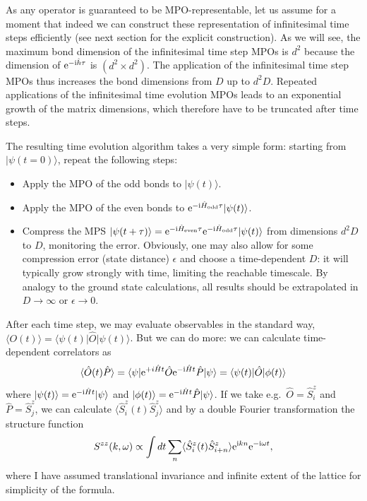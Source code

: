 \documentclass[a4paper,10pt,oneside,onecolumn,1p,times]{elsarticle}
\newcommand{\eul}{{\rm e }}
\newcommand{\imag}{{\rm i }}
\newcommand{\bra}[1]{\mbox{$\langle #1  |$}}
\newcommand{\ket}[1]{\mbox{$| #1  \rangle$}}
\begin{document}
As any operator is guaranteed to be MPO-representable, let us assume for a moment that indeed we can construct these representation of infinitesimal time steps efficiently (see next section for the explicit construction). As we will see, the maximum bond dimension of the infinitesimal time step MPOs is $d^2$ because the dimension of $\eul^{-\imag \hat{h} \tau}$ is $(d^2 \times d^2)$. The application of the infinitesimal time step MPOs thus increases the bond dimensions from $D$ up to $d^2 D$. Repeated applications of the infinitesimal time evolution MPOs leads to an exponential growth of the matrix dimensions, which therefore have to be truncated after time steps.

The resulting time evolution algorithm takes a very simple form: starting from $\ket{\psi(t=0)}$, repeat the following steps:
\begin{itemize}
\item Apply the MPO of the odd bonds to $\ket{\psi(t)}$.
\item Apply the MPO of the even bonds to $\eul^{-\imag \hat{H}_{{\rm odd}}\tau}\ket{\psi(t)}$.
\item Compress the MPS $\ket{\psi(t+\tau)}=\eul^{-\imag \hat{H}_{{\rm even}}\tau}\eul^{-\imag \hat{H}_{{\rm odd}}\tau}\ket{\psi(t)}$ from dimensions $d^2 D$ to $D$, monitoring the error. Obviously, one may also allow for some compression error (state distance) $\epsilon$ and choose a time-dependent $D$: it will typically grow strongly with time, limiting the reachable timescale. By analogy to the ground state calculations, all results should be extrapolated in $D\rightarrow\infty$ or $\epsilon\rightarrow 0$.
\end{itemize}

After each time step, we may evaluate observables in the standard way, $\langle O(t) \rangle = \bra{\psi(t)} \hat{O} \ket{\psi(t)}$. But we can do more: we can calculate time-dependent correlators as
\begin{equation}
\langle \hat{O}(t) \hat{P} \rangle = \bra{\psi} \eul^{+i\hat{H}t} \hat{O} \eul^{-\imag \hat{H}t} \hat{P} \ket{\psi}
= \bra{\psi(t)} \hat{O} \ket{\phi(t)}
\end{equation}
where $\ket{\psi(t)} = \eul^{-\imag \hat{H}t}\ket{\psi}$ and $\ket{\phi(t)} = \eul^{-\imag \hat{H}t} \hat{P} \ket{\psi}$. If we take e.g.\ $\hat{O} = \hat{S}^z_i$ and $\hat{P} = \hat{S}^z_j$, we can calculate 
$\langle \hat{S}^z_i(t) \hat{S}^z_j \rangle$ and by a double Fourier transformation the structure function
\begin{equation}
S^{zz}(k,\omega) \propto \int dt \sum_{n} \langle \hat{S}^z_i(t) \hat{S}^z_{i+n} \rangle \eul^{\imag kn}\eul^{-\imag \omega t},
\end{equation}
where I have assumed translational invariance and infinite extent of the lattice for simplicity of the formula.
\end{document}
